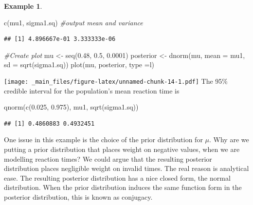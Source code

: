 \documentclass[
]{book}
\newenvironment{Shaded}{\begin{snugshade}}{\end{snugshade}}
\newcommand{\AttributeTok}[1]{\textcolor[rgb]{0.77,0.63,0.00}{#1}}
\newcommand{\CommentTok}[1]{\textcolor[rgb]{0.56,0.35,0.01}{\textit{#1}}}
\newcommand{\FloatTok}[1]{\textcolor[rgb]{0.00,0.00,0.81}{#1}}
\newcommand{\FunctionTok}[1]{\textcolor[rgb]{0.00,0.00,0.00}{#1}}
\newcommand{\NormalTok}[1]{#1}
\newcommand{\OtherTok}[1]{\textcolor[rgb]{0.56,0.35,0.01}{#1}}
\newcommand{\StringTok}[1]{\textcolor[rgb]{0.31,0.60,0.02}{#1}}
\theoremstyle{definition}
\theoremstyle{definition}
\newtheorem{example}{Example}[chapter]
\theoremstyle{definition}
\theoremstyle{definition}
\theoremstyle{remark}
\begin{document}
\begin{example}
\begin{Shaded}
\begin{Highlighting}[]
\FunctionTok{c}\NormalTok{(mu1, sigma1.sq) }\CommentTok{\#output mean and variance}
\end{Highlighting}
\end{Shaded}

\begin{verbatim}
## [1] 4.896667e-01 3.333333e-06
\end{verbatim}

\begin{Shaded}
\begin{Highlighting}[]
\CommentTok{\#Create plot}
\NormalTok{mu }\OtherTok{\textless{}{-}} \FunctionTok{seq}\NormalTok{(}\FloatTok{0.48}\NormalTok{, }\FloatTok{0.5}\NormalTok{, }\FloatTok{0.0001}\NormalTok{) }
\NormalTok{posterior }\OtherTok{\textless{}{-}} \FunctionTok{dnorm}\NormalTok{(mu, }\AttributeTok{mean =}\NormalTok{ mu1, }\AttributeTok{sd =} \FunctionTok{sqrt}\NormalTok{(sigma1.sq))}
\FunctionTok{plot}\NormalTok{(mu, posterior, }\AttributeTok{type =}\StringTok{\textquotesingle{}l\textquotesingle{}}\NormalTok{)}
\end{Highlighting}
\end{Shaded}

\texttt{[image: \_main\_files/figure-latex/unnamed-chunk-14-1.pdf]}
The 95\% credible interval for the population's mean reaction time is

\begin{Shaded}
\begin{Highlighting}[]
\FunctionTok{qnorm}\NormalTok{(}\FunctionTok{c}\NormalTok{(}\FloatTok{0.025}\NormalTok{, }\FloatTok{0.975}\NormalTok{), mu1, }\FunctionTok{sqrt}\NormalTok{(sigma1.sq))}
\end{Highlighting}
\end{Shaded}

\begin{verbatim}
## [1] 0.4860883 0.4932451
\end{verbatim}

\end{example}

One issue in this example is the choice of the prior distribution for \(\mu\). Why are we putting a prior distribution that places weight on negative values, when we are modelling reaction times? We could argue that the resulting posterior distribution places negligible weight on invalid times. The real reason is analytical ease. The resulting posterior distribution has a nice closed form, the normal distribution. When the prior distribution induces the same function form in the posterior distribution, this is known as conjugacy.
\end{document}
